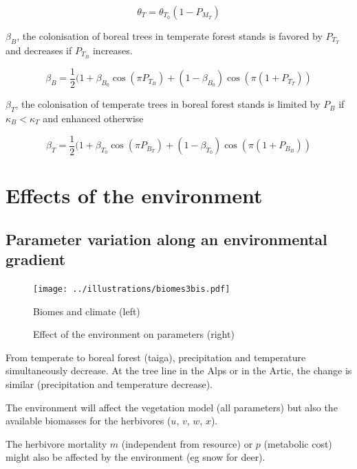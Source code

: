 \[
\theta_T = \theta_{T_0}(1-P_{M_T})
\]

$\beta_B$, the colonisation of boreal trees in temperate forest stands is favored by $P_{T_T}$ and decreases if $P_{T_B}$ increases.

\[
\beta_B = \frac{1}{2} (1+\beta_{B_0}\cos(\pi P_{T_B}) + (1-\beta_{B_0})\cos(\pi(1+P_{T_T}))
\]


$\beta_T$, the colonisation of temperate trees in boreal forest stands is limited by $P_B$ if $\kappa_B<\kappa_T$ and enhanced otherwise

\[
\beta_T = \frac{1}{2} (1+\beta_{T_0}\cos(\pi P_{B_T}) + (1-\beta_{T_0})\cos(\pi(1+P_{B_B}))
\]






\newpage
\section{Effects of the environment}


\subsection*{Parameter variation along an environmental gradient}

\begin{figure}[!h]
\centering
\texttt{[image: ../illustrations/biomes3bis.pdf]}
\caption{Biomes and climate (left)}
\caption{Effect of the environment on parameters (right)}
\end{figure}

From temperate to boreal forest (taiga), precipitation and temperature simultaneously decrease. At the tree line in the Alps or in the Artic, the change is similar (precipitation and temperature decrease).

The environment will affect the vegetation model (all parameters)
but also the available biomasses for the herbivores ($u$, $v$, $w$, $x$).

The herbivore mortality $m$ (independent from resource) or $p$ (metabolic cost) might also be affected by the environment (eg snow for deer).




